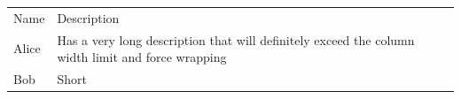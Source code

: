 \documentclass{article}
\begin{document}
\begin{table}[h]
\begin{tabular}{ll}
Name & Description \\
Alice & Has a very long description that will definitely exceed the column width limit and force wrapping \\
Bob & Short \\
\end{tabular}
\end{table}
\end{document}
